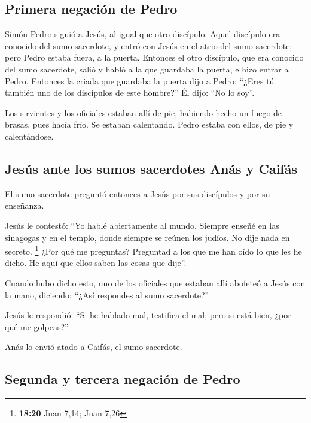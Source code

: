 \begin{paracol}{2}
\hypertarget{primera-negaciuxf3n-de-pedro}{%
\subsection{Primera negación de
Pedro}\label{primera-negaciuxf3n-de-pedro}}

 Simón Pedro siguió a Jesús, al igual que otro discípulo.
Aquel discípulo era conocido del sumo sacerdote, y entró con Jesús en el
atrio del sumo sacerdote;  pero Pedro estaba fuera, a la
puerta. Entonces el otro discípulo, que era conocido del sumo sacerdote,
salió y habló a la que guardaba la puerta, e hizo entrar a Pedro.
 Entonces la criada que guardaba la puerta dijo a Pedro:
``¿Eres tú también uno de los discípulos de este hombre?'' Él dijo: ``No
lo soy''.

 Los sirvientes y los oficiales estaban allí de pie,
habiendo hecho un fuego de brasas, pues hacía frío. Se estaban
calentando. Pedro estaba con ellos, de pie y calentándose.

\hypertarget{jesuxfas-ante-los-sumos-sacerdotes-anuxe1s-y-caifuxe1s}{%
\subsection{Jesús ante los sumos sacerdotes Anás y
Caifás}\label{jesuxfas-ante-los-sumos-sacerdotes-anuxe1s-y-caifuxe1s}}

 El sumo sacerdote preguntó entonces a Jesús por sus
discípulos y por su enseñanza.

 Jesús le contestó: ``Yo hablé abiertamente al mundo.
Siempre enseñé en las sinagogas y en el templo, donde siempre se reúnen
los judíos. No dije nada en secreto. \footnote{\textbf{18:20} Juan 7,14;
  Juan 7,26}  ¿Por qué me preguntas? Preguntad a los que
me han oído lo que les he dicho. He aquí que ellos saben las cosas que
dije''.

 Cuando hubo dicho esto, uno de los oficiales que estaban
allí abofeteó a Jesús con la mano, diciendo: ``¿Así respondes al sumo
sacerdote?''

 Jesús le respondió: ``Si he hablado mal, testifica el
mal; pero si está bien, ¿por qué me golpeas?''

 Anás lo envió atado a Caifás, el sumo sacerdote.

\hypertarget{segunda-y-tercera-negaciuxf3n-de-pedro}{%
\subsection{Segunda y tercera negación de
Pedro}\label{segunda-y-tercera-negaciuxf3n-de-pedro}}


\end{paracol}

